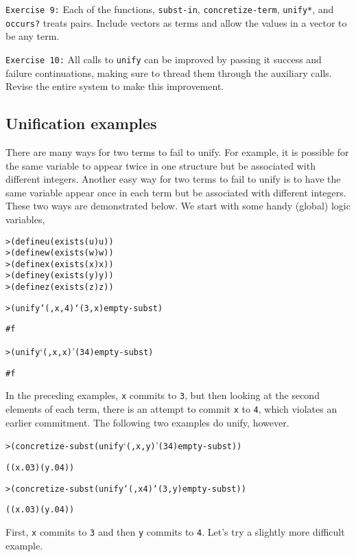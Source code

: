 \texttt{Exercise 9:} Each of the functions, \texttt{subst-in},
\texttt{concretize-term}, \texttt{unify*}, and \texttt{occurs?}
treats pairs.  Include vectors as terms and allow the values in
a vector to be any term.

\texttt{Exercise 10:} All calls to \texttt{unify} can be improved by
passing it success and failure continuations, making sure to thread
them through the auxiliary calls.  Revise the entire system to make
this improvement.

\subsection{Unification examples}

There are many ways for two terms to fail to unify.  For example, it
is possible for the same variable to appear twice in one structure but
be associated with different integers.  Another easy way for two terms
to fail to unify is to have the same variable appear once in each term
but be associated with different integers.  These two ways are
demonstrated below. We start with some handy (global) logic variables,

\begin{alltt}
> (define u (exists (u) u))
> (define w (exists (w) w))
> (define x (exists (x) x))
> (define y (exists (y) y))
> (define z (exists (z) z))
\end{alltt}

\begin{alltt}
> (unify `(,x ,4) `(3 ,x) empty-subst)

#f

> (unify `(,x ,x) '(3 4) empty-subst)

#f
\end{alltt}

\noindent
In the preceding examples, \texttt{x} commits to \texttt{3},
but then looking at the second elements of each term, there is an
attempt to commit \texttt{x} to \texttt{4}, which violates an
earlier commitment.  The following two examples do unify, however.

\begin{alltt}
> (concretize-subst (unify `(,x ,y) '(3 4) empty-subst))

((x.0 3) (y.0 4))

> (concretize-subst (unify `(,x 4) `(3 ,y) empty-subst))

((x.0 3) (y.0 4))
\end{alltt}

\noindent
First, \texttt{x} commits to \texttt{3} and then \texttt{y}
commits to \texttt{4}.  Let's try a slightly more difficult
example.

